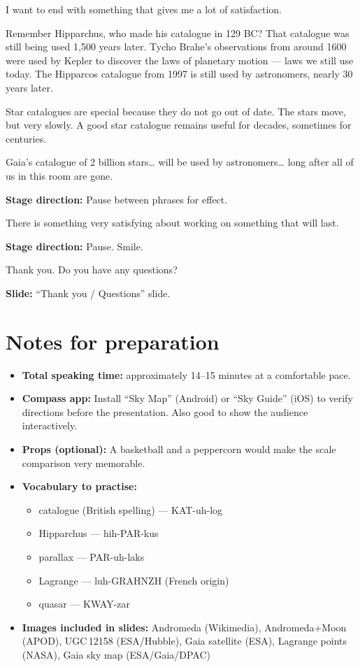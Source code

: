 \documentclass[10pt,a4paper]{article}
\newenvironment{stagenote}
  {\begin{mdframed}[linecolor=blue!50, backgroundcolor=blue!5, linewidth=1pt]%
   \small\color{blue!70!black}\textbf{Stage direction:} }
  {\end{mdframed}}
\newenvironment{slidenote}
  {\begin{mdframed}[linecolor=green!50!black, backgroundcolor=green!5, linewidth=1pt]%
   \small\color{green!40!black}\textbf{Slide:} }
  {\end{mdframed}}
\begin{document}
I want to end with something that gives me a lot of satisfaction.

Remember Hipparchus, who made his catalogue in 129 BC? That catalogue was still being used 1,500 years later. Tycho Brahe's observations from around 1600 were used by Kepler to discover the laws of planetary motion --- laws we still use today. The Hipparcos catalogue from 1997 is still used by astronomers, nearly 30 years later.

Star catalogues are special because they do not go out of date. The stars move, but very slowly. A good star catalogue remains useful for decades, sometimes for centuries.

Gaia's catalogue of 2 billion stars\ldots{} will be used by astronomers\ldots{} long after all of us in this room are gone.

\begin{stagenote}
Pause between phrases for effect.
\end{stagenote}

There is something very satisfying about working on something that will last.

\begin{stagenote}
Pause. Smile.
\end{stagenote}

Thank you. Do you have any questions?

\begin{slidenote}
``Thank you / Questions'' slide.
\end{slidenote}

\section*{Notes for preparation}

\begin{itemize}
    \item \textbf{Total speaking time:} approximately 14--15 minutes at a comfortable pace.
    \item \textbf{Compass app:} Install ``Sky Map'' (Android) or ``Sky Guide'' (iOS) to verify directions before the presentation. Also good to show the audience interactively.
    \item \textbf{Props (optional):} A basketball and a peppercorn would make the scale comparison very memorable.
    \item \textbf{Vocabulary to practise:}
    \begin{itemize}
        \item catalogue (British spelling) --- KAT-uh-log
        \item Hipparchus --- hih-PAR-kus
        \item parallax --- PAR-uh-laks
        \item Lagrange --- luh-GRAHNZH (French origin)
        \item quasar --- KWAY-zar
    \end{itemize}
    \item \textbf{Images included in slides:} Andromeda (Wikimedia), Andromeda+Moon (APOD), UGC\,12158 (ESA/Hubble), Gaia satellite (ESA), Lagrange points (NASA), Gaia sky map (ESA/Gaia/DPAC)
\end{itemize}
\end{document}
